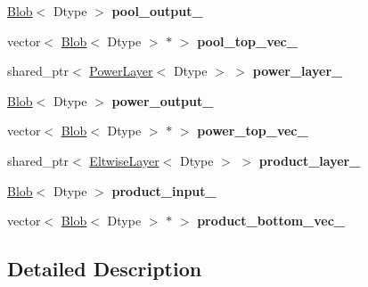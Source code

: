 \begin{DoxyCompactItemize}
\mbox{\hyperlink{classcaffe_1_1_blob}{Blob}}$<$ Dtype $>$ {\bfseries pool\+\_\+output\+\_\+}
\item 
\mbox{\label{classcaffe_1_1_l_r_n_layer_a265099f3f7300afd57b23e60ccee5208}} 
vector$<$ \mbox{\hyperlink{classcaffe_1_1_blob}{Blob}}$<$ Dtype $>$ $\ast$ $>$ {\bfseries pool\+\_\+top\+\_\+vec\+\_\+}
\item 
\mbox{\label{classcaffe_1_1_l_r_n_layer_afb677e3b61fca7413398a1a1ca187244}} 
shared\+\_\+ptr$<$ \mbox{\hyperlink{classcaffe_1_1_power_layer}{Power\+Layer}}$<$ Dtype $>$ $>$ {\bfseries power\+\_\+layer\+\_\+}
\item 
\mbox{\label{classcaffe_1_1_l_r_n_layer_a51d6bf5639197b082c3fc83d25bec5ff}} 
\mbox{\hyperlink{classcaffe_1_1_blob}{Blob}}$<$ Dtype $>$ {\bfseries power\+\_\+output\+\_\+}
\item 
\mbox{\label{classcaffe_1_1_l_r_n_layer_a16e1329d878ce185d69c30378c15d928}} 
vector$<$ \mbox{\hyperlink{classcaffe_1_1_blob}{Blob}}$<$ Dtype $>$ $\ast$ $>$ {\bfseries power\+\_\+top\+\_\+vec\+\_\+}
\item 
\mbox{\label{classcaffe_1_1_l_r_n_layer_a4a6443f6e0db7baaf4a95b9afb000404}} 
shared\+\_\+ptr$<$ \mbox{\hyperlink{classcaffe_1_1_eltwise_layer}{Eltwise\+Layer}}$<$ Dtype $>$ $>$ {\bfseries product\+\_\+layer\+\_\+}
\item 
\mbox{\label{classcaffe_1_1_l_r_n_layer_a8b664a27f7517f326cc918c1c0228b82}} 
\mbox{\hyperlink{classcaffe_1_1_blob}{Blob}}$<$ Dtype $>$ {\bfseries product\+\_\+input\+\_\+}
\item 
\mbox{\label{classcaffe_1_1_l_r_n_layer_a71d1bc489d1566e9c7b0a36736acd48b}} 
vector$<$ \mbox{\hyperlink{classcaffe_1_1_blob}{Blob}}$<$ Dtype $>$ $\ast$ $>$ {\bfseries product\+\_\+bottom\+\_\+vec\+\_\+}
\end{DoxyCompactItemize}


\subsection{Detailed Description}
